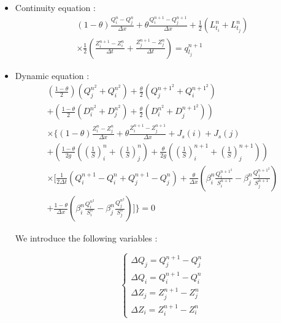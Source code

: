 \begin{itemize}
  \item Continuity equation :
  \begin{eqnarray}
    (1 - \theta) \frac{Q_{i}^n - Q_{j}^n}{\Delta x} + \theta \frac{Q_{i}^{n+1} - Q_{j}^{n+1}}{\Delta x} + \frac{1}{2} \left ( L_{t_i}^n + L_{t_j}^n \right ) \nonumber \\
    \times \frac{1}{2} \left ( \frac{Z_{i}^{n+1} - Z_{i}^n}{\Delta t} + \frac{Z_{j}^{n+1} - Z_{j}^n}{\Delta t} \right ) = q_{l_j}^{n+1}
  \end{eqnarray}

  \item Dynamic equation :
  \begin{eqnarray}
    \left ( \frac{1 - \theta }{2} \right ) \left ( Q_{j}^{n^2} + Q_{i}^{n^2} \right ) + \frac{\theta}{2} \left ( Q_{j}^{n+1^2} + Q_{i}^{n+1^2} \right ) \nonumber \\
    + \left ( \frac{1 - \theta}{2} \left ( D_{i}^{n^2} + D_{j}^{n^2} \right ) + \frac{\theta}{2} \left ( D_{i}^{n^2} + D_{j}^{n+1^2} \right ) \right ) \nonumber \\
    \times \Bigg \{ (1 - \theta) \frac{Z_{i}^n - Z_{j}^n}{\Delta x} + \theta \frac{Z_{i}^{n+1} - Z_{j}^{n+1}}{\Delta x} + J_{s}(i) + J_{s}(j) \nonumber \\
    + \left ( \frac{1 - \theta}{2 g} \left ( \left ( \frac{1}{S} \right )_{i}^n + \left ( \frac{1}{S} \right )_{j}^n \right ) + \frac{\theta}{2 g} \left ( \left ( \frac{1}{S} \right )_{i}^{n+1} + \left ( \frac{1}{S} \right )_{j}^{n+1} \right ) \right ) \nonumber \\
    \times \Bigg [ \frac{1}{2 \Delta t}(Q_{i}^{n+1}-Q_{i}^n+Q_{j}^{n+1}-Q_{j}^n) + \frac{\theta}{\Delta x} \left ( \beta_{i}^n \frac{Q_{i}^{n+1^2}}{S_{i}^{n+1}}-\beta_{j}^n \frac{Q_{j}^{n+1^2}}{S_{j}^{n+1}} \right ) \nonumber \\
    + \frac{1-\theta}{\Delta x} \left ( \beta_{i}^n \frac{Q_{i}^{n^2}}{S_{i}^{n}}-\beta_{j}^n \frac{Q_{j}^{n^2}}{S_{j}^{n}} \right ) \Bigg ] \Bigg \} = 0
  \end{eqnarray}

\vspace{0.5cm}

We introduce the following variables :

\begin{equation}
 \left \lbrace
  \begin{array}{l}
    \Delta Q_j = Q_{j}^{n+1} - Q_{j}^n \\
    \Delta Q_i = Q_{i}^{n+1} - Q_{i}^n \\
    \Delta Z_j = Z_{j}^{n+1} - Z_{j}^n \\
    \Delta Z_i = Z_{i}^{n+1} - Z_{i}^n
  \end{array}
 \right.
\end{equation}


\end{itemize}
